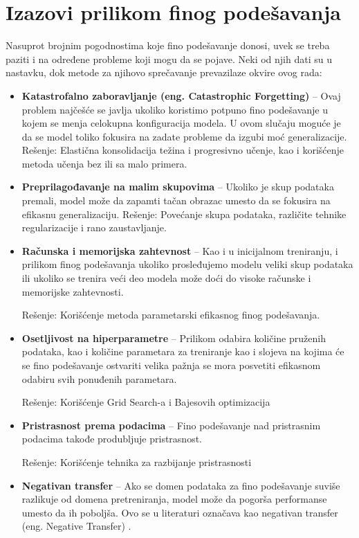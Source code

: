 \documentclass[12pt,oneside]{memoir}
\begin{document}
\section{Izazovi prilikom finog podešavanja}
Nasuprot brojnim pogodnostima koje fino podešavanje donosi, uvek se treba paziti i na određene probleme koji mogu da se pojave. Neki od njih dati su u nastavku, dok metode za njihovo sprečavanje prevazilaze okvire ovog rada:


\begin{itemize}
	\item \textbf{Katastrofalno zaboravljanje (eng. Catastrophic Forgetting)} – Ovaj problem najčešće se javlja ukoliko koristimo potpuno fino podešavanje u kojem se menja celokupna konfiguracija modela. U ovom slučaju moguće je da se model toliko fokusira na zadate probleme da izgubi moć generalizacije.
	Rešenje: Elastična konsolidacija težina i progresivno učenje, kao i korišćenje metoda učenja bez ili sa malo primera.
	\item \textbf{Preprilagođavanje na malim skupovima} – Ukoliko je skup podataka premali, model može da zapamti tačan obrazac umesto da se fokusira na efikasnu generalizaciju.
	Rešenje: Povećanje skupa podataka, različite tehnike regularizacije \cite{regularizationtechniques} i rano zaustavljanje.
	\item \textbf{Računska i memorijska zahtevnost} – Kao i u inicijalnom treniranju, i prilikom finog podešavanja ukoliko prosleđujemo modelu veliki skup podataka ili ukoliko se trenira veći deo modela može doći do visoke računske i memorijske zahtevnosti.
	
	Rešenje: Korišćenje metoda parametarski efikasnog finog podešavanja.
	\item \textbf{Osetljivost na hiperparametre} – Prilikom odabira količine pruženih podataka, kao i količine parametara za treniranje kao i slojeva na kojima će se fino podešavanje ostvariti velika pažnja se mora posvetiti efikasnom odabiru svih ponuđenih parametara.
	
	Rešenje: Korišćenje Grid Search-a i Bajesovih optimizacija \cite{gridsearchandbayes}
	\item \textbf{Pristrasnost prema podacima} – Fino podešavanje nad pristrasnim podacima takođe produbljuje pristrasnost. 
	
	Rešenje: Korišćenje tehnika za razbijanje pristrasnosti \cite{biasandmitigation}
	
	\item \textbf{Negativan transfer} – Ako se domen podataka za fino podešavanje suviše razlikuje od domena pretreniranja, model može da pogorša performanse umesto da ih poboljša. Ovo se u literaturi označava kao negativan transfer (eng. Negative Transfer) \cite{negativetransfer}.
	

\end{itemize}
\end{document}
